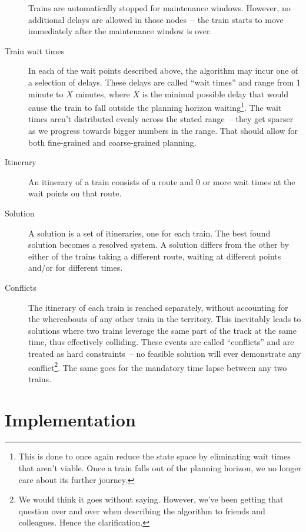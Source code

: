 \documentclass[10pt,a4paper,final]{article}
\begin{document}
\begin{description}
Trains are automatically stopped for maintenance windows. However, no additional delays are allowed in those nodes~-- the train starts to move immediately after the maintenance window is over.

\item[Train wait times] In each of the wait points described above, the algorithm may incur one of a selection of delays. These delays are called ``wait times'' and range from 1 minute to $X$ minutes, where $X$ is the minimal possible delay that would cause the train to fall outside the planning horizon waiting\footnote{This is done to once again reduce the state space by eliminating wait times that aren't viable. Once a train falls out of the planning horizon, we no longer care about its further journey.}. The wait times aren't distributed evenly across the stated range~-- they get sparser as we progress towards bigger numbers in the range. That should allow for both fine-grained and coarse-grained planning.

\item[Itinerary] An itinerary of a train consists of a route and 0 or more wait times at the wait points on that route.

\item[Solution] A solution is a set of itineraries, one for each train. The best found solution becomes a resolved system. A solution differs from the other by either of the trains taking a different route, waiting at different points and/or for different times.

\item[Conflicts] The itinerary of each train is reached separately, without accounting for the whereabouts of any other train in the territory. This inevitably leads to solutions where two trains leverage the same part of the track at the same time, thus effectively colliding. These events are called ``conflicts'' and are treated as hard constraints~-- no feasible solution will ever demonstrate any conflict\footnote{We would think it goes without saying. However, we've been getting that question over and over when describing the algorithm to friends and colleagues. Hence the clarification.}. The same goes for the mandatory time lapse between any two trains.

\end{description}

\section{Implementation}
\end{document}
